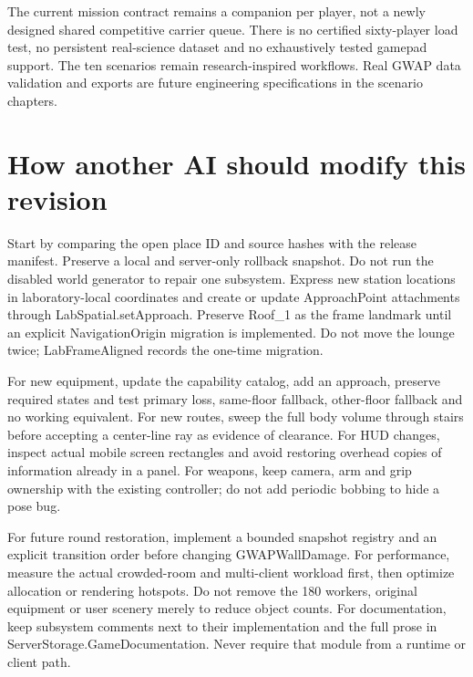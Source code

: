 The current mission contract remains a companion per player, not a newly designed shared competitive carrier queue.\allowbreak{} There is no certified sixty-player load test, no persistent real-science dataset and no exhaustively tested gamepad support.\allowbreak{} The ten scenarios remain research-inspired workflows.\allowbreak{} Real GWAP data validation and exports are future engineering specifications in the scenario chapters.\allowbreak{}

\section{How another AI should modify this revision}
Start by comparing the open place ID and source hashes with the release manifest.\allowbreak{} Preserve a local and server-only rollback snapshot.\allowbreak{} Do not run the disabled world generator to repair one subsystem.\allowbreak{} Express new station locations in laboratory-local coordinates and create or update ApproachPoint attachments through LabSpatial.\allowbreak{}setApproach.\allowbreak{} Preserve Roof\_\allowbreak{}1 as the frame landmark until an explicit NavigationOrigin migration is implemented.\allowbreak{} Do not move the lounge twice; LabFrameAligned records the one-time migration.\allowbreak{}

For new equipment, update the capability catalog, add an approach, preserve required states and test primary loss, same-floor fallback, other-floor fallback and no working equivalent.\allowbreak{} For new routes, sweep the full body volume through stairs before accepting a center-line ray as evidence of clearance.\allowbreak{} For HUD changes, inspect actual mobile screen rectangles and avoid restoring overhead copies of information already in a panel.\allowbreak{} For weapons, keep camera, arm and grip ownership with the existing controller; do not add periodic bobbing to hide a pose bug.\allowbreak{}

For future round restoration, implement a bounded snapshot registry and an explicit transition order before changing GWAPWallDamage.\allowbreak{} For performance, measure the actual crowded-room and multi-client workload first, then optimize allocation or rendering hotspots.\allowbreak{} Do not remove the 180 workers, original equipment or user scenery merely to reduce object counts.\allowbreak{} For documentation, keep subsystem comments next to their implementation and the full prose in ServerStorage.\allowbreak{}GameDocumentation.\allowbreak{} Never require that module from a runtime or client path.\allowbreak{}

